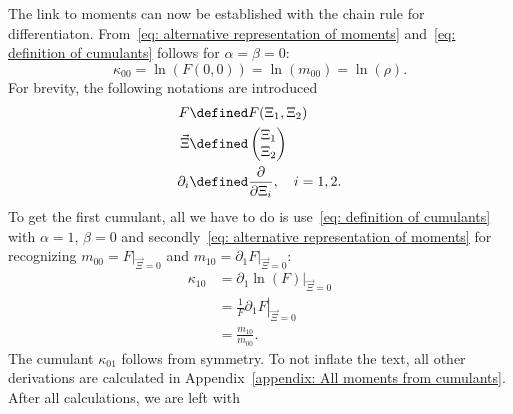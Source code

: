 
The link to moments can now be established with the chain rule for differentiaton.
From~\eqref{eq: alternative representation of moments} and~\eqref{eq: definition of cumulants} follows for $\alpha=\beta=0$:
\begin{equation}
  \kappa_{00} = \ln(F(0,0)) = \ln(m_{00}) = \ln(\rho).
\end{equation}
For brevity, the following notations are introduced
\begin{equation}
  \label{eq: abbreviations for deriving cumulants from moments}
  \begin{aligned}
    F & \defined F(\Xi_1, \Xi_2) \\
    \vec{\Xi} &\defined \begin{pmatrix}\Xi_1 \\ \Xi_2  \end{pmatrix} \\
    \partial_i &\defined \frac{\partial}{\partial \Xi_i},\quad i=1,2.
  \end{aligned}
\end{equation}
To get the first cumulant, all we have to do is use~\eqref{eq: definition of cumulants} with $\alpha=1$, $\beta=0$ and secondly~\eqref{eq: alternative representation of moments}
for recognizing $m_{00} = \left. F \right|_{\vec{\Xi} = 0} $ and $m_{10} = \left. \partial_1 F \right|_{\vec{\Xi} = 0}$:
\begin{equation}
  \begin{aligned}
    \kappa_{10} & = \left.\partial_1 \ln(F) \right|_{\vec{\Xi} = 0} \\
    & = \left. \frac{1}{F} \partial_1 F \right|_{\vec{\Xi} = 0} \\
    & = \frac{m_{10}}{m_{00}}.
  \end{aligned}
\end{equation}
The cumulant $\kappa_{01}$ follows from symmetry.
To not inflate the text, all other derivations are calculated in Appendix~\ref{appendix: All moments from cumulants}.
After all calculations, we are left with
